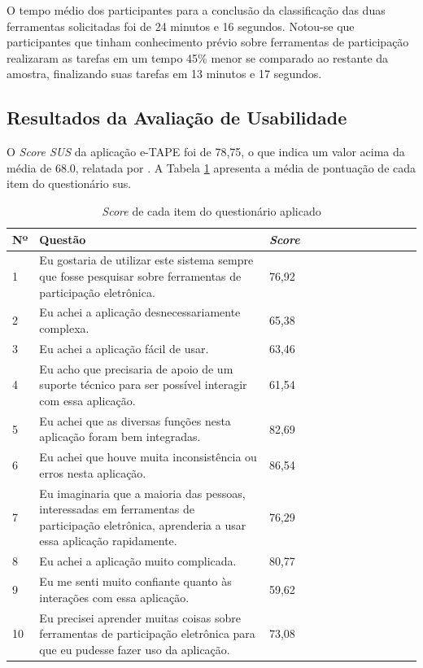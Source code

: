 \par
O tempo médio dos participantes para a conclusão da classificação das duas ferramentas solicitadas foi de 24 minutos e 16 segundos. 
Notou-se que participantes que tinham conhecimento prévio sobre ferramentas de participação realizaram 
as tarefas em um tempo 45\% menor se comparado ao restante da amostra, finalizando suas tarefas em 13 minutos e 17 segundos.

\subsection{Resultados da Avaliação de Usabilidade}
\label{subsec:resultados-sus}
O \textit{Score SUS} da aplicação e-TAPE foi de 78,75, o que indica um valor acima da média de 68.0, relatada por .
A Tabela \ref{tab:resultado-questionario} apresenta a média de pontuação de cada item do questionário \acrshort{sus}.

\begin{table}[!ht]
    \centering
    \caption{\textit{Score} de cada item do questionário aplicado}
    \label{tab:resultado-questionario}
    \begin{tabular}{l*{3}{>{\raggedright\arraybackslash}p{0.66\linewidth}p{0.1\linewidth}}}
    \toprule
    Nº & Questão & \textit{Score}    \\
    \midrule
    1 & Eu gostaria de utilizar este sistema sempre que fosse pesquisar sobre ferramentas de participação eletrônica. & 76,92 \\
    2 & Eu achei a aplicação desnecessariamente complexa. & 65,38 \\
    3 & Eu achei a aplicação fácil de usar. & 63,46 \\
    4 & Eu acho que precisaria de apoio de um suporte técnico para ser possível interagir com essa aplicação. & 61,54 \\
    5 & Eu achei que as diversas funções nesta aplicação foram bem integradas.  & 82,69 \\
    6 & Eu achei que houve muita inconsistência ou erros nesta aplicação.  & 86,54 \\
    7 & Eu imaginaria que a maioria das pessoas, interessadas em ferramentas de participação eletrônica, aprenderia a usar essa aplicação rapidamente. & 76,29 \\
    8 & Eu achei a aplicação muito complicada.  & 80,77 \\
    9 & Eu me senti muito confiante quanto às interações com essa aplicação.  & 59,62 \\
    10 & Eu precisei aprender muitas coisas sobre ferramentas de participação eletrônica para que eu pudesse fazer uso da aplicação. & 73,08 \\
    \bottomrule
    \end{tabular}
\end{table}

